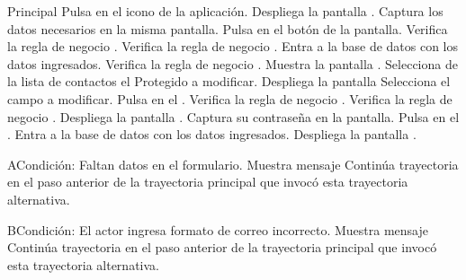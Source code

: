 	\begin{UCtrayectoria}{Principal}
		\UCpaso[\UCactor] Pulsa en el icono de la aplicación.
		\UCpaso[\UCsist] Despliega la pantalla .
		\UCpaso[\UCactor] Captura los datos necesarios en la misma pantalla.
		\UCpaso[\UCactor] Pulsa en el botón  de la pantalla.
		\UCpaso[\UCsist] Verifica la regla de negocio . 
		\UCpaso[\UCsist] Verifica la regla de negocio . 
		\UCpaso[\UCsist] Entra a la base de datos con los datos ingresados. 
		\UCpaso[\UCsist] Verifica la regla de negocio . 		
		\UCpaso[\UCsist] Muestra la pantalla .
		\UCpaso[\UCactor] Selecciona de la lista de contactos el Protegido a modificar.
		\UCpaso[\UCactor] Despliega la pantalla 		
		\UCpaso[\UCactor] Selecciona el campo a modificar.
		\UCpaso[\UCactor] Pulsa en el  .
		\UCpaso[\UCsist] Verifica la regla de negocio . 
		\UCpaso[\UCsist] Verifica la regla de negocio . 
		\UCpaso[\UCsist] Despliega la pantalla .
		\UCpaso[\UCactor] Captura su contraseña en la pantalla.
		\UCpaso[\UCactor] Pulsa en el .
		\UCpaso[\UCsist] Entra a la base de datos con los datos ingresados.   
		\UCpaso[\UCsist] Despliega la pantalla .
	\end{UCtrayectoria}
	\begin{UCtrayectoriaA}{A}{Condición: Faltan datos en el formulario.}
		\UCpaso[\UCsist] Muestra mensaje 
		\UCpaso[\UCsist] Continúa trayectoria en el paso anterior de la trayectoria  principal que invocó esta trayectoria alternativa. 
	\end{UCtrayectoriaA}
	\begin{UCtrayectoriaA}{B}{Condición: El actor ingresa formato de correo incorrecto.}
		\UCpaso[\UCsist] Muestra mensaje 
		\UCpaso[\UCsist] Continúa trayectoria en el paso anterior de la trayectoria  principal que invocó esta trayectoria alternativa.  
	\end{UCtrayectoriaA}
